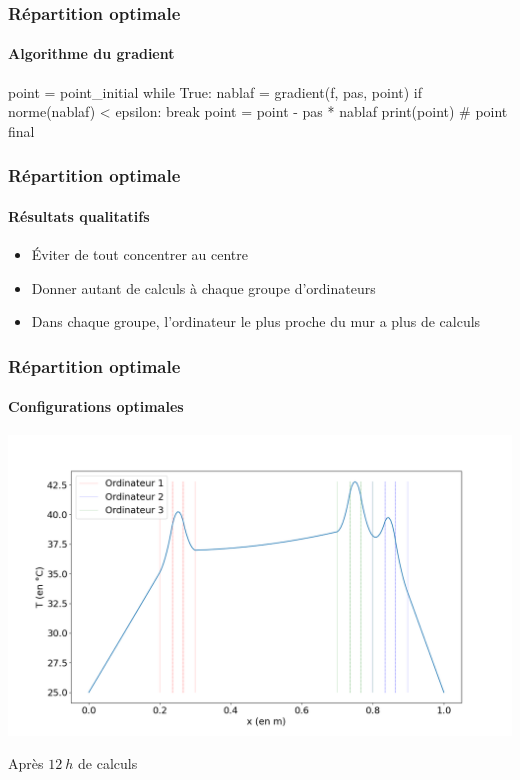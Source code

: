 \documentclass[a4paper,11pt]{beamer}
\begin{document}
\begin{frame}[fragile]
    \frametitle{Répartition optimale}
    \framesubtitle{Algorithme du gradient}

    \begin{python}
point = point_initial
while True:
    nablaf = gradient(f, pas, point)
    if norme(nablaf) < epsilon:
        break
    point = point - pas * nablaf
print(point) # point final
    \end{python}
\end{frame}

\begin{frame}
    \frametitle{Répartition optimale}
    \framesubtitle{Résultats qualitatifs}

    \begin{itemize}
        \item Éviter de tout concentrer au centre
        \item Donner autant de calculs à chaque groupe d'ordinateurs
        \item Dans chaque groupe, l'ordinateur le plus proche du mur a plus de calculs
    \end{itemize}
\end{frame}

\begin{frame}
    \frametitle{Répartition optimale}
    \framesubtitle{Configurations optimales}

    \includegraphics[width=\textwidth]{min_position.png}

    \begin{center}
        Après $\SI{12}{h}$ de calculs
    \end{center}
\end{frame}
\end{document}
